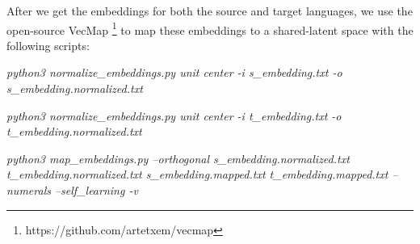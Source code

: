 \documentclass[11pt,a4paper]{article}
\begin{document}
After we get the embeddings for both the source and target languages, we use the open-source VecMap \footnote{https://github.com/artetxem/vecmap} to map these embeddings to a shared-latent space with the following scripts:

\emph{python3 normalize\_embeddings.py unit center -i s\_embedding.txt -o s\_embedding.normalized.txt}

\emph{python3 normalize\_embeddings.py unit center -i t\_embedding.txt -o t\_embedding.normalized.txt}

\emph{python3 map\_embeddings.py --orthogonal s\_embedding.normalized.txt t\_embedding.normalized.txt s\_embedding.mapped.txt t\_embedding.mapped.txt --numerals --self\_learning -v}
\end{document}
